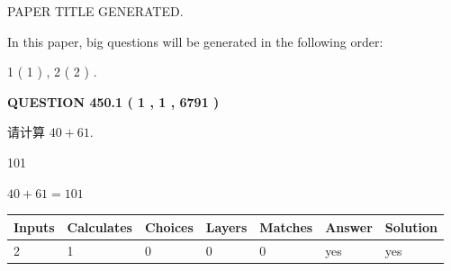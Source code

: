 \documentclass{ctexart}
\begin{document}
   
 \vspace{0.2in}
 
 
 
 
   
   
 PAPER TITLE GENERATED.
   
   
   
\vspace{0.2in}
   
In this paper, big questions will be generated in the following order: 
   
   
   1 ( 1 )
 ,
   2 ( 2 )
 .
  
\vspace{0.2in}
  
{\textbf{\Large{QUESTION
450.1 
 ( 1 , 1 , 6791 )
}}}
  
  
 
请计算 $ %
40 +  %
61 $.
 
 
 
\noindent{}
 
 

101
 
 
\noindent{}
 
 

 
 
 
\noindent{}
 
 

$ %
40 +  %
61=   %
101$
 
 
\noindent{}
 
 

 
   
   
   
   
\noindent\begin{tabular}{|l|l|l|l|l|l|l|}
 \hline
Inputs & Calculates & Choices & Layers & Matches & Answer & Solution \\ \hline
 2  & 
 1  & 
 0
  & 
 0  & 
 0  & 
  yes & 
  yes 
  \\ \hline
 \end{tabular}
   
   
   
   
\noindent{}
   
   
  
\end{document}
